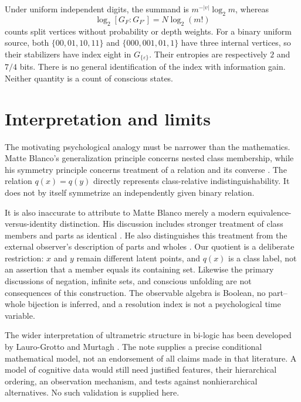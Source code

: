 \documentclass[11pt]{article}
\theoremstyle{definition}
\theoremstyle{remark}
\newcommand{\eps}{\varepsilon}
\begin{document}
Under uniform independent digits, the summand is $m^{-|v|}\log_2m$, whereas
\[
 \log_2[G_F:G_{F'}]=N\log_2(m!)
\]
counts split vertices without probability or depth weights. For a binary uniform source, both $\{00,01,10,11\}$ and $\{000,001,01,1\}$ have three internal vertices, so their stabilizers have index eight in $G_{\{\eps\}}$. Their entropies are respectively $2$ and $7/4$ bits. There is no general identification of the index with information gain. Neither quantity is a count of conscious states.

\section{Interpretation and limits}\label{sec:limits}
The motivating psychological analogy must be narrower than the mathematics. Matte Blanco's generalization principle concerns nested class membership, while his symmetry principle concerns treatment of a relation and its converse \cite[pp.~38--39]{MatteBlanco1975}. The relation $q(x)=q(y)$ directly represents class-relative indistinguishability. It does not by itself symmetrize an independently given binary relation.

It is also inaccurate to attribute to Matte Blanco merely a modern equivalence-versus-identity distinction. His discussion includes stronger treatment of class members and parts as identical \cite[p.~39]{MatteBlanco1975}. He also distinguishes this treatment from the external observer's description of parts and wholes \cite[pp.~148--149]{MatteBlanco1975}. Our quotient is a deliberate restriction: $x$ and $y$ remain different latent points, and $q(x)$ is a class label, not an assertion that a member equals its containing set. Likewise the primary discussions of negation, infinite sets, and conscious unfolding \cite[pp.~45--46, 146--149, 107--108]{MatteBlanco1975} are not consequences of this construction. The observable algebra is Boolean, no part--whole bijection is inferred, and a resolution index is not a psychological time variable.

The wider interpretation of ultrametric structure in bi-logic has been developed by Lauro-Grotto and Murtagh \cite{LauroGrotto2008,Murtagh2012,Murtagh2014}. The note supplies a precise conditional mathematical model, not an endorsement of all claims made in that literature. A model of cognitive data would still need justified features, their hierarchical ordering, an observation mechanism, and tests against nonhierarchical alternatives. No such validation is supplied here.
\end{document}
